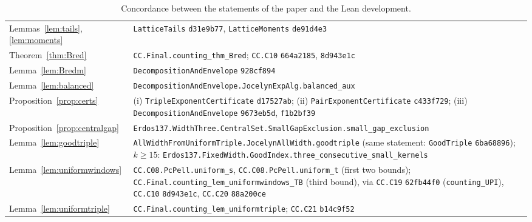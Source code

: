 \documentclass[11pt,reqno]{amsart}
\theoremstyle{definition}
\theoremstyle{remark}
\numberwithin{equation}{section}
\begin{document}
\begin{table}[ht]
\begin{tabular}{@{}>{\raggedright}p{3.4cm}>{\raggedright\arraybackslash}p{11.4cm}@{}}
Lemmas~\ref{lem:tails}, \ref{lem:moments} & \texttt{LatticeTails} \texttt{d31e9b77}, \texttt{LatticeMoments} \texttt{de91d4e3}\\
Theorem~\ref{thm:Bred} & \texttt{CC.Final.counting\_thm\_Bred}; \texttt{CC.C10} \texttt{664a2185}, \texttt{8d943e1c}\\
Lemma~\ref{lem:Bredm} & \texttt{DecompositionAndEnvelope} \texttt{928cf894}\\
Lemma~\ref{lem:balanced} & \texttt{DecompositionAndEnvelope.JocelynExpAlg.balanced\_aux}\\
Proposition~\ref{prop:certs} & (i) \texttt{TripleExponentCertificate} \texttt{d17527ab}; (ii) \texttt{PairExponentCertificate} \texttt{c433f729}; (iii) \texttt{DecompositionAndEnvelope} \texttt{9673eb5d}, \texttt{f1b2bf39}\\
Proposition~\ref{prop:centralgap} & \texttt{Erdos137.WidthThree.CentralSet.SmallGapExclusion.small\_gap\_exclusion}\\
Lemma~\ref{lem:goodtriple} & \texttt{AllWidthFromUniformTriple.JocelynAllWidth.goodtriple} (same statement: \texttt{GoodTriple} \texttt{6ba68896}); $k\ge15$: \texttt{Erdos137.FixedWidth.GoodIndex.three\_consecutive\_small\_kernels}\\
Lemma~\ref{lem:uniformwindows} & \texttt{CC.C08.PcPell.uniform\_s}, \texttt{CC.C08.PcPell.uniform\_t} (first two bounds); \texttt{CC.Final.counting\_lem\_uniformwindows\_TB} (third bound), via \texttt{CC.C19} \texttt{62fb44f0} (\texttt{counting\_UPI}), \texttt{CC.C10} \texttt{8d943e1c}, \texttt{CC.C20} \texttt{88a200ce}\\
Lemma~\ref{lem:uniformtriple} & \texttt{CC.Final.counting\_lem\_uniformtriple}; \texttt{CC.C21} \texttt{b14c9f52}\\
\bottomrule
\end{tabular}
\caption{Concordance between the statements of the paper and the Lean development.}\label{tab:concordance}
\end{table}
\end{document}
